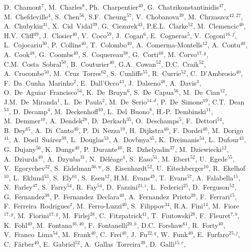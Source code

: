 \documentclass[12pt,a4paper]{article}
\begin{document}
\begin{flushleft}
D.~Chamont$^{7}$,
M.~Charles$^{8}$,
Ph.~Charpentier$^{40}$,
G.~Chatzikonstantinidis$^{47}$,
M.~Chefdeville$^{4}$,
S.~Chen$^{56}$,
S.F.~Cheung$^{57}$,
V.~Chobanova$^{39}$,
M.~Chrzaszcz$^{42,27}$,
A.~Chubykin$^{31}$,
X.~Cid~Vidal$^{39}$,
G.~Ciezarek$^{43}$,
P.E.L.~Clarke$^{52}$,
M.~Clemencic$^{40}$,
H.V.~Cliff$^{49}$,
J.~Closier$^{40}$,
V.~Coco$^{59}$,
J.~Cogan$^{6}$,
E.~Cogneras$^{5}$,
V.~Cogoni$^{16,f}$,
L.~Cojocariu$^{30}$,
P.~Collins$^{40}$,
T.~Colombo$^{40}$,
A.~Comerma-Montells$^{12}$,
A.~Contu$^{40}$,
A.~Cook$^{48}$,
G.~Coombs$^{40}$,
S.~Coquereau$^{38}$,
G.~Corti$^{40}$,
M.~Corvo$^{17,g}$,
C.M.~Costa~Sobral$^{50}$,
B.~Couturier$^{40}$,
G.A.~Cowan$^{52}$,
D.C.~Craik$^{52}$,
A.~Crocombe$^{50}$,
M.~Cruz~Torres$^{62}$,
S.~Cunliffe$^{55}$,
R.~Currie$^{52}$,
C.~D'Ambrosio$^{40}$,
F.~Da~Cunha~Marinho$^{2}$,
E.~Dall'Occo$^{43}$,
J.~Dalseno$^{48}$,
A.~Davis$^{3}$,
O.~De~Aguiar~Francisco$^{54}$,
K.~De~Bruyn$^{6}$,
S.~De~Capua$^{56}$,
M.~De~Cian$^{12}$,
J.M.~De~Miranda$^{1}$,
L.~De~Paula$^{2}$,
M.~De~Serio$^{14,d}$,
P.~De~Simone$^{19}$,
C.T.~Dean$^{53}$,
D.~Decamp$^{4}$,
M.~Deckenhoff$^{10}$,
L.~Del~Buono$^{8}$,
H.-P.~Dembinski$^{11}$,
M.~Demmer$^{10}$,
A.~Dendek$^{28}$,
D.~Derkach$^{35}$,
O.~Deschamps$^{5}$,
F.~Dettori$^{54}$,
B.~Dey$^{65}$,
A.~Di~Canto$^{40}$,
P.~Di~Nezza$^{19}$,
H.~Dijkstra$^{40}$,
F.~Dordei$^{40}$,
M.~Dorigo$^{41}$,
A.~Dosil~Su{\'a}rez$^{39}$,
L.~Douglas$^{53}$,
A.~Dovbnya$^{45}$,
K.~Dreimanis$^{54}$,
L.~Dufour$^{43}$,
G.~Dujany$^{56}$,
K.~Dungs$^{40}$,
P.~Durante$^{40}$,
R.~Dzhelyadin$^{37}$,
M.~Dziewiecki$^{12}$,
A.~Dziurda$^{40}$,
A.~Dzyuba$^{31}$,
N.~D{\'e}l{\'e}age$^{4}$,
S.~Easo$^{51}$,
M.~Ebert$^{52}$,
U.~Egede$^{55}$,
V.~Egorychev$^{32}$,
S.~Eidelman$^{36,w}$,
S.~Eisenhardt$^{52}$,
U.~Eitschberger$^{10}$,
R.~Ekelhof$^{10}$,
L.~Eklund$^{53}$,
S.~Ely$^{61}$,
S.~Esen$^{12}$,
H.M.~Evans$^{49}$,
T.~Evans$^{57}$,
A.~Falabella$^{15}$,
N.~Farley$^{47}$,
S.~Farry$^{54}$,
R.~Fay$^{54}$,
D.~Fazzini$^{21,i}$,
L.~Federici$^{25}$,
D.~Ferguson$^{52}$,
G.~Fernandez$^{38}$,
P.~Fernandez~Declara$^{40}$,
A.~Fernandez~Prieto$^{39}$,
F.~Ferrari$^{15}$,
F.~Ferreira~Rodrigues$^{2}$,
M.~Ferro-Luzzi$^{40}$,
S.~Filippov$^{34}$,
R.A.~Fini$^{14}$,
M.~Fiore$^{17,g}$,
M.~Fiorini$^{17,g}$,
M.~Firlej$^{28}$,
C.~Fitzpatrick$^{41}$,
T.~Fiutowski$^{28}$,
F.~Fleuret$^{7,b}$,
K.~Fohl$^{40}$,
M.~Fontana$^{16,40}$,
F.~Fontanelli$^{20,h}$,
D.C.~Forshaw$^{61}$,
R.~Forty$^{40}$,
V.~Franco~Lima$^{54}$,
M.~Frank$^{40}$,
C.~Frei$^{40}$,
J.~Fu$^{22,q}$,
W.~Funk$^{40}$,
E.~Furfaro$^{25,j}$,
C.~F{\"a}rber$^{40}$,
E.~Gabriel$^{52}$,
A.~Gallas~Torreira$^{39}$,
D.~Galli$^{15,e}$,

\end{flushleft}
\end{document}
